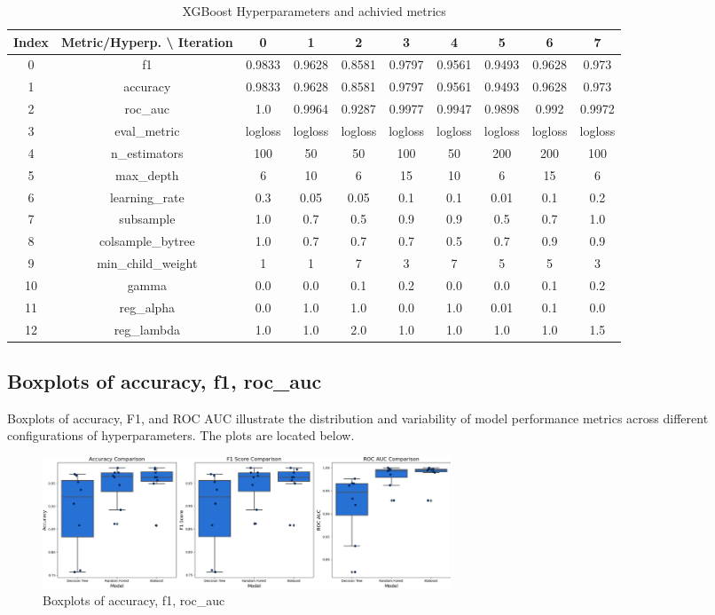\documentclass{article}%
\begin{document}
\begin{table}[h!]%
\caption{XGBoost Hyperparameters and achivied metrics}%
\vspace{0.2cm}%
\centering%
\begin{tabular}{|c||c||c||c||c||c||c||c||c||c|}%
\hline%
Index&Metric/Hyperp. \textbackslash{} Iteration&0&1&2&3&4&5&6&7\\%
\hline%
0&f1&0.9833&0.9628&0.8581&0.9797&0.9561&0.9493&0.9628&0.973\\%
1&accuracy&0.9833&0.9628&0.8581&0.9797&0.9561&0.9493&0.9628&0.973\\%
2&roc\_auc&1.0&0.9964&0.9287&0.9977&0.9947&0.9898&0.992&0.9972\\%
3&eval\_metric&logloss&logloss&logloss&logloss&logloss&logloss&logloss&logloss\\%
4&n\_estimators&100&50&50&100&50&200&200&100\\%
5&max\_depth&6&10&6&15&10&6&15&6\\%
6&learning\_rate&0.3&0.05&0.05&0.1&0.1&0.01&0.1&0.2\\%
7&subsample&1.0&0.7&0.5&0.9&0.9&0.5&0.7&1.0\\%
8&colsample\_bytree&1.0&0.7&0.7&0.7&0.5&0.7&0.9&0.9\\%
9&min\_child\_weight&1&1&7&3&7&5&5&3\\%
10&gamma&0.0&0.0&0.1&0.2&0.0&0.0&0.1&0.2\\%
11&reg\_alpha&0.0&1.0&1.0&0.0&1.0&0.01&0.1&0.0\\%
12&reg\_lambda&1.0&1.0&2.0&1.0&1.0&1.0&1.0&1.5\\%
\hline%
\end{tabular}%
\end{table}

%
\newpage%
\subsection{Boxplots of accuracy, f1, roc\_auc}%
\label{subsec:Boxplotsofaccuracy,f1,rocauc}%
Boxplots of accuracy, F1, and ROC AUC illustrate the distribution and variability of model performance metrics across different configurations of hyperparameters. The plots are located below.%


\begin{figure}[h!]%
\centering%
\includegraphics[width=460px]{ModelOptimization/box_plots_metrics.png}%
\caption{Boxplots of accuracy, f1, roc\_auc}%
\end{figure}
\end{document}
